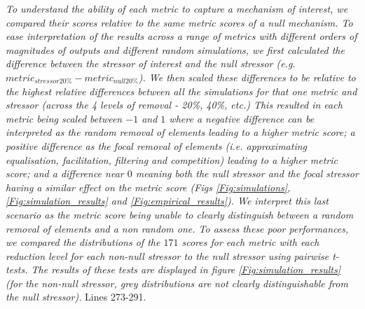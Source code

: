 \documentclass[
]{article}
\begin{document}
\textit{To understand the ability of each metric to capture a mechanism of interest, we compared their scores relative to the same metric scores of a null mechanism.
To ease interpretation of the results across a range of metrics with different orders of magnitudes of outputs and different random simulations, we first calculated the difference between the stressor of interest and the null stressor (e.g. $metric_{stressor20\%} - metric_{null20\%}$).
We then scaled these differences to be relative to the highest relative differences between all the simulations for that one metric and stressor (across the 4 levels of removal - 20\%, 40\%, etc.)
This resulted in each metric being scaled between $-1$ and $1$ where a negative difference can be interpreted as the random removal of elements leading to a higher metric score; a positive difference as the focal removal of elements (i.e. approximating equalisation, facilitation, filtering and competition) leading to a higher metric score; and a difference near $0$ meaning both the null stressor and the focal stressor having a similar effect on the metric score (Figs \ref{Fig:simulations}, \ref{Fig:simulation_results} and \ref{Fig:empirical_results}).
We interpret this last scenario as the metric score being unable to clearly distinguish between a random removal of elements and a non random one.
To assess these poor performances, we compared the distributions of the $171$ scores for each metric with each reduction level for each non-null stressor to the null stressor using pairwise t-tests.
The results of these tests are displayed in figure \ref{Fig:simulation_results} (for the non-null stressor, grey distributions are not clearly distinguishable from the null stressor).}
Lines 273-291.

\end{document}
